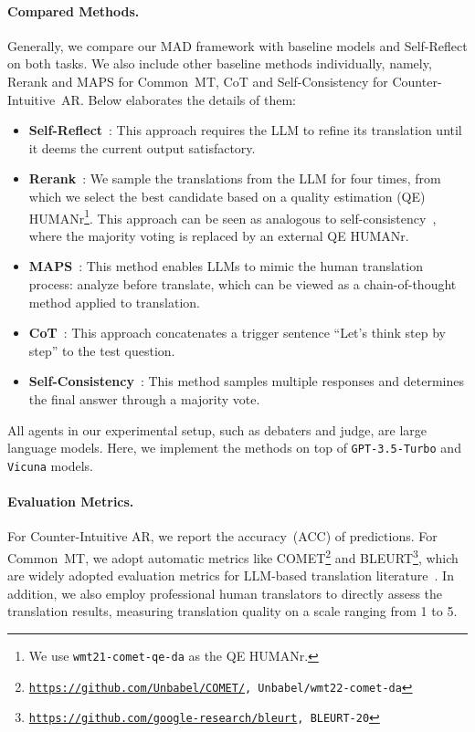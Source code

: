 \paragraph{Compared Methods.}
Generally, we compare our MAD framework with baseline models and Self-Reflect on both tasks. We also include other baseline methods individually, namely, Rerank and MAPS for Common~MT, CoT and Self-Consistency for Counter-Intuitive~AR. Below elaborates the details of them:
\begin{itemize}[leftmargin=10pt]
    \item \textbf{Self-Reflect}~\citep{shinn2023reflexion}: This approach requires the LLM to refine its translation until it deems the current output satisfactory.
    
    \item \textbf{Rerank}~\citep{he2023exploring}: We sample the translations from the LLM for four times, from which we select the best candidate based on a quality estimation (QE) HUMANr\footnote{We use \texttt{wmt21-comet-qe-da} as the QE HUMANr.}.
    This approach can be seen as analogous to self-consistency~\citep{wang2022self}, where the majority voting is replaced by an external QE HUMANr. 
    \item \textbf{MAPS}~\citep{he2023exploring}: This method enables LLMs to mimic the human translation process: analyze before translate, which can be viewed as a chain-of-thought method applied to translation. 
    
    \item \textbf{CoT}~\citep{kojimalarge}: This approach concatenates a trigger sentence ``Let’s think step by step''  to the test question.
    \item \textbf{Self-Consistency}~\citep{wang2022self}: This method samples multiple responses and determines the final answer through a majority vote. 
   
\end{itemize}

All agents in our experimental setup, such as debaters and judge, are large language models. Here, we implement the methods on top of \texttt{GPT-3.5-Turbo} and \texttt{Vicuna} models.


\paragraph{Evaluation Metrics.}
For Counter-Intuitive AR, we report the accuracy~(ACC) of predictions.
For Common~MT, we adopt automatic metrics like COMET\footnote{\texttt{\url{https://github.com/Unbabel/COMET/}, Unbabel/wmt22-comet-da}} and BLEURT\footnote{\texttt{\url{https://github.com/google-research/bleurt}, BLEURT-20}}, which are widely adopted evaluation metrics for LLM-based translation literature~\citep{he2023exploring,gpt-mt-2023,garcia2023unreasonable,pilault2023interactive}. 
In addition, we also employ professional human translators to directly assess the translation results, measuring translation quality on a scale ranging from 1 to 5.

